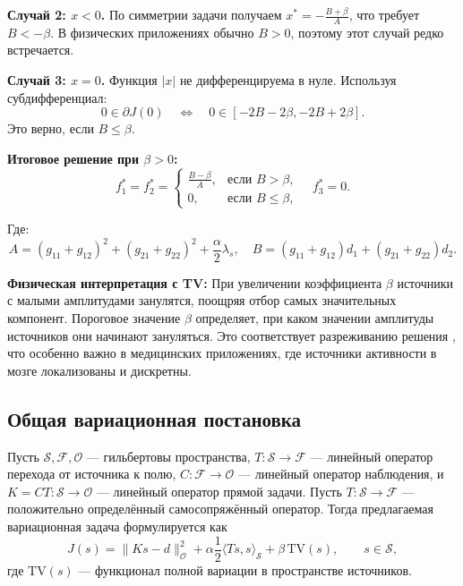 \documentclass[a4paper,14pt,oneside,openany]{extarticle}
\begin{document}
\textbf{Случай 2: $x < 0$.} По симметрии задачи получаем $x^* = -\frac{B + \beta}{A}$, что требует $B < -\beta$. В физических приложениях обычно $B > 0$, поэтому этот случай редко встречается.

\textbf{Случай 3: $x = 0$.} Функция $|x|$ не дифференцируема в нуле. Используя субдифференциал:
\begin{equation}
    0 \in \partial J(0) \quad \Leftrightarrow \quad 0 \in [-2B - 2\beta, -2B + 2\beta].
\end{equation}
Это верно, если $B \leq \beta$.

\textbf{Итоговое решение при $\beta > 0$:}
\begin{equation}
    f^*_1 = f^*_2 = \begin{cases}
    \frac{B - \beta}{A}, & \text{если } B > \beta, \\[6pt]
    0, & \text{если } B \leq \beta,
    \end{cases} \quad f^*_3 = 0.
\end{equation}

Где:
\begin{equation}
    A = (g_{11}+g_{12})^2 + (g_{21}+g_{22})^2 + \frac{\alpha}{2} \lambda_s, \quad B = (g_{11}+g_{12})d_1 + (g_{21}+g_{22})d_2.
\end{equation}

\textbf{Физическая интерпретация с TV:} При увеличении коэффициента $\beta$ источники с малыми амплитудами 
занулятся, поощряя отбор самых значительных компонент. Пороговое значение $\beta$ определяет, 
при каком значении амплитуды источников они начинают зануляться.
Это соответствует разреживанию решения , что особенно важно в медицинских приложениях,
где источники активности в мозге локализованы и дискретны.

\subsection{Общая вариационная постановка}

Пусть $\mathcal{S},\mathcal{F},\mathcal{O}$ — гильбертовы пространства, $T:\mathcal{S}\to\mathcal{F}$ — 
линейный оператор перехода от источника к полю, $C:\mathcal{F}\to\mathcal{O}$ — линейный оператор 
наблюдения, и $K=C T:\mathcal{S}\to\mathcal{O}$ — линейный оператор прямой задачи. Пусть 
$T:\mathcal{S}\to\mathcal{F}$ — положительно определённый самосопряжённый оператор. Тогда предлагаемая вариационная задача формулируется как
\begin{equation}\label{eq:general_functional}
    J(s)=\|K s - d\|_{\mathcal{O}}^2 + \alpha \frac12 \langle T s, s\rangle_{\mathcal{S}} + \beta \,\mathrm{TV}(s),
    \qquad s\in \mathcal{S},
\end{equation}
где $\mathrm{TV}(s)$ — функционал полной вариации в пространстве источников.
\end{document}

